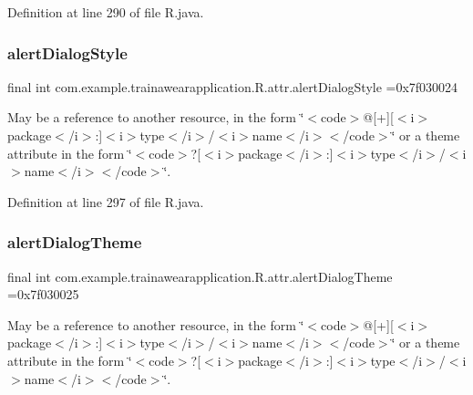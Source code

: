 Definition at line 290 of file R.\+java.

\mbox{\label{classcom_1_1example_1_1trainawearapplication_1_1_r_1_1attr_a437ddf73fe1b4b8d493425f91c7f036a}} 
\subsubsection{\texorpdfstring{alertDialogStyle}{alertDialogStyle}}
{\footnotesize\ttfamily final int com.\+example.\+trainawearapplication.\+R.\+attr.\+alert\+Dialog\+Style =0x7f030024\hspace{0.3cm}{\ttfamily [static]}}

May be a reference to another resource, in the form \char`\"{}$<$code$>$@\mbox{[}+\mbox{]}\mbox{[}$<$i$>$package$<$/i$>$\+:\mbox{]}$<$i$>$type$<$/i$>$/$<$i$>$name$<$/i$>$$<$/code$>$\char`\"{} or a theme attribute in the form \char`\"{}$<$code$>$?\mbox{[}$<$i$>$package$<$/i$>$\+:\mbox{]}$<$i$>$type$<$/i$>$/$<$i$>$name$<$/i$>$$<$/code$>$\char`\"{}. 

Definition at line 297 of file R.\+java.

\mbox{\label{classcom_1_1example_1_1trainawearapplication_1_1_r_1_1attr_a2ba65c9f0736319ac149fa6cf48e7488}} 
\subsubsection{\texorpdfstring{alertDialogTheme}{alertDialogTheme}}
{\footnotesize\ttfamily final int com.\+example.\+trainawearapplication.\+R.\+attr.\+alert\+Dialog\+Theme =0x7f030025\hspace{0.3cm}{\ttfamily [static]}}

May be a reference to another resource, in the form \char`\"{}$<$code$>$@\mbox{[}+\mbox{]}\mbox{[}$<$i$>$package$<$/i$>$\+:\mbox{]}$<$i$>$type$<$/i$>$/$<$i$>$name$<$/i$>$$<$/code$>$\char`\"{} or a theme attribute in the form \char`\"{}$<$code$>$?\mbox{[}$<$i$>$package$<$/i$>$\+:\mbox{]}$<$i$>$type$<$/i$>$/$<$i$>$name$<$/i$>$$<$/code$>$\char`\"{}. 

